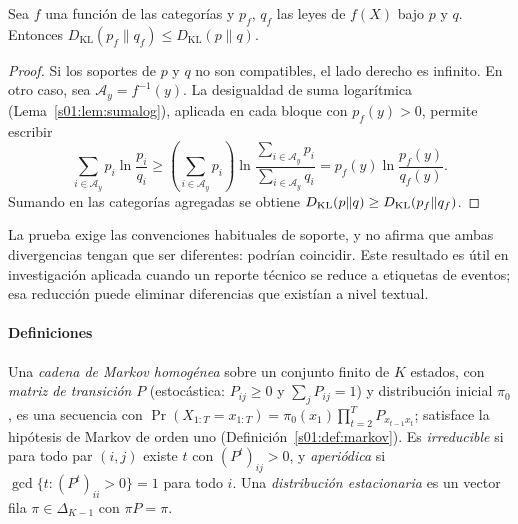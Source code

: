 \begin{proposicion}\label{s01:prop:procesamiento}
Sea $f$ una función de las categorías y $p_f$, $q_f$ las leyes de $f(X)$ bajo $p$ y
$q$. Entonces $D_{\mathrm{KL}}(p_f\|q_f)\le D_{\mathrm{KL}}(p\|q)$.
\end{proposicion}
\begin{proof}
Si los soportes de $p$ y $q$ no son compatibles, el lado derecho es infinito. En
otro caso, sea $\mathcal A_y=f^{-1}(y)$. La desigualdad de suma logarítmica
(Lema~\ref{s01:lem:sumalog}), aplicada en cada bloque con $p_f(y)>0$, permite
escribir
\[
\sum_{i\in \mathcal A_y}p_i\ln\frac{p_i}{q_i}
\ge\left(\sum_{i\in \mathcal A_y}p_i\right)
\ln\frac{\sum_{i\in \mathcal A_y}p_i}{\sum_{i\in \mathcal A_y}q_i}
=p_f(y)\ln\frac{p_f(y)}{q_f(y)}.
\]
Sumando en las categorías agregadas se obtiene
$D_{\rm KL}(p\|q)\ge D_{\rm KL}(p_f\|q_f)$.
\end{proof}
\noindent La prueba exige las convenciones habituales de soporte, y no afirma
que ambas divergencias tengan que ser diferentes: podrían coincidir.
Este resultado es útil en investigación aplicada cuando un reporte
técnico se reduce a etiquetas de eventos; esa reducción puede eliminar
diferencias que existían a nivel textual.

\paragraph{Definiciones}
Una \emph{cadena de Markov homogénea} sobre un conjunto finito de $K$ estados, con
\emph{matriz de transición} $P$ (estocástica: $P_{ij}\ge0$ y $\sum_jP_{ij}=1$) y
distribución inicial $\pi_0$, es una secuencia con
$\Pr(X_{1:T}=x_{1:T})=\pi_0(x_1)\prod_{t=2}^TP_{x_{t-1}x_t}$; satisface la
hipótesis de Markov de orden uno (Definición~\ref{s01:def:markov}). Es
\emph{irreducible} si para todo par $(i,j)$ existe $t$ con $(P^t)_{ij}>0$, y
\emph{aperiódica} si $\gcd\{t:(P^t)_{ii}>0\}=1$ para todo $i$. Una
\emph{distribución estacionaria} es un vector fila $\pi\in\Delta_{K-1}$ con
$\pi P=\pi$.

